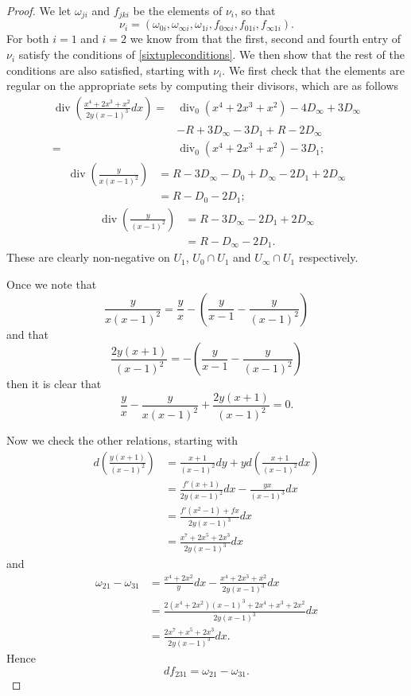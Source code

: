\documentclass[draft, 11pt]{article} %
\theoremstyle{plain}
\theoremstyle{remark}
\DeclareMathOperator{\di}{div}
\begin{document}
\begin{proof}
We let $\omega_{ji}$ and $f_{jki}$ be the elements of $\nu_i$, so that
\[
\nu_i = (\omega_{0i}, \omega_{\infty i}, \omega_{1i}, f_{0\infty i}, f_{01i}, f_{\infty 1 i} ).
\]
For both $i=1$ and $i=2$ we know from \cite[Thm. 2.3]{derhamactions} that the first, second and fourth entry of $\nu_i$ satisfy the conditions of \eqref{sixtupleconditions}.
We then show that the rest of the conditions are also satisfied, starting with $\nu_i$.
We first check that the elements are regular on the appropriate sets by computing their divisors, which are as follows
\begin{align}
\di \left( \frac{x^4 + 2x^3 + x^2}{2y(x-1)^3}dx \right)  = &\di_0(x^4 + 2x^3 + x^2) - 4D_\infty + 3D_\infty \\
& - R +3D_\infty -3D_1 +R - 2D_\infty \\
= & \di_0(x^4 + 2x^3 + x^2) - 3D_1;
\end{align}
\begin{align}
\di \left(\frac{y}{x(x-1)^2} \right) & = R - 3D_\infty - D_0 + D_\infty - 2D_1 + 2D_\infty \\
& = R - D_0 - 2D_1;
\end{align}
\begin{align}
\di \left( \frac{y}{(x-1)^2} \right) & = R - 3D_\infty - 2D_1 + 2D_\infty \\
& = R - D_\infty - 2D_1.
\end{align}
These are clearly non-negative on $U_1$, $U_0 \cap U_1$ and $U_\infty \cap U_1$ respectively.

Once we note that 
\[
\frac{y}{x(x-1)^2} = \frac{y}{x} -\left(\frac{y}{x-1} - \frac{y}{(x-1)^2} \right)
\]
and that
\[
\frac{2y(x+1)}{(x-1)^2} = -\left( \frac{y}{x-1} - \frac{y}{(x-1)^2}\right)
\]
then it is clear that
\[
\frac{y}{x} - \frac{y}{x(x-1)^2} + \frac{2y(x+1)}{(x-1)^2} = 0.
\]

Now we check the other relations, starting with
\begin{align}
d \left( \frac{y(x+1)}{(x-1)^2} \right) & = \frac{x+1}{(x-1)^2}dy + y d \left( \frac{x+1}{(x-1)^2}dx \right) \\
& = \frac{f'(x+1)}{2y(x-1)^2}dx - \frac{yx}{(x-1)^3} dx \\
& = \frac{f'(x^2-1) +fx}{2y(x-1)^3}dx \\
& = \frac{x^7 + 2x^5 + 2x^3}{2y(x-1)^3}dx
\end{align}
and
\begin{align}
\omega_{21} - \omega_{31} & = \frac{x^4 + 2x^2}{y}dx - \frac{x^4 + 2x^3 + x^2}{2y(x-1)^3} dx \\
& = \frac{2(x^4 + 2x^2)(x-1)^3 + 2x^4 + x^3 + 2x^2}{2y(x-1)^3}dx \\
& = \frac{2x^7 + x^5 + 2x^3}{2y(x-1)^3}dx.
\end{align}
Hence 
\[
df_{231} = \omega_{21} - \omega_{31}.
\]


\end{proof}
\end{document}
